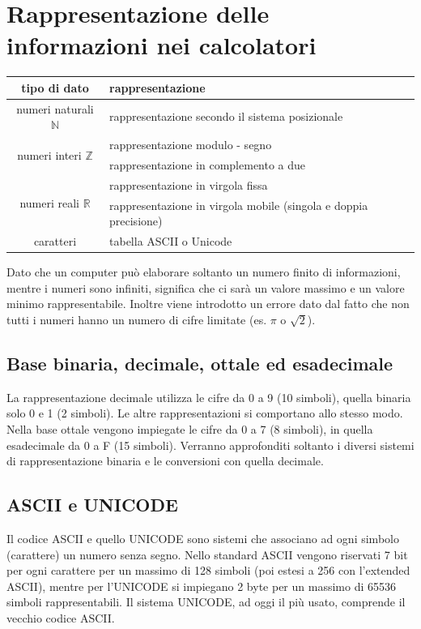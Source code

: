 \documentclass[a4paper]{article}
\begin{document}
\section{Rappresentazione delle informazioni nei calcolatori}
\begin{center}
	\begin{tabularx}{\textwidth}{c X}
		\textbf{tipo di dato} & \textbf{rappresentazione} \\
		\toprule
		numeri naturali \(\mathbb{N}\) & rappresentazione secondo il sistema posizionale \\
		\midrule
		\multirow{2}{*}{numeri interi \(\mathbb{Z}\)} & rappresentazione modulo - segno \\
		& rappresentazione in complemento a due \\
		\midrule
		\multirow{2}{*}{numeri reali \(\mathbb{R}\)} & rappresentazione in virgola fissa \\
		& rappresentazione in virgola mobile (singola e doppia precisione) \\
		\midrule
		caratteri & tabella ASCII o Unicode
	\end{tabularx}
\end{center}

Dato che un computer può elaborare soltanto un numero finito di informazioni, mentre i numeri sono infiniti, significa che
ci sarà un valore massimo e un valore minimo rappresentabile. Inoltre viene introdotto un errore dato dal fatto che non tutti
i numeri hanno un numero di cifre limitate (es. \(\pi\) o \(\sqrt{2}\)).

\subsection{Base binaria, decimale, ottale ed esadecimale}
La rappresentazione decimale utilizza le cifre da 0 a 9 (10 simboli), quella binaria solo 0 e 1 (2 simboli). Le altre
rappresentazioni si comportano allo stesso modo. Nella base ottale vengono impiegate le cifre da 0 a 7 (8 simboli),
in quella esadecimale da 0 a F (15 simboli). Verranno approfonditi soltanto i diversi sistemi di rappresentazione
binaria e le conversioni con quella decimale.

\subsection{ASCII e UNICODE}
Il codice ASCII e quello UNICODE sono sistemi che associano ad ogni simbolo (carattere) un numero senza segno. Nello standard
ASCII vengono riservati 7 bit per ogni carattere per un massimo di 128 simboli (poi estesi a 256 con l'extended ASCII), mentre
per l'UNICODE si impiegano 2 byte per un massimo di 65536 simboli rappresentabili. Il sistema UNICODE, ad oggi il più usato,
comprende il vecchio codice ASCII.
\end{document}
